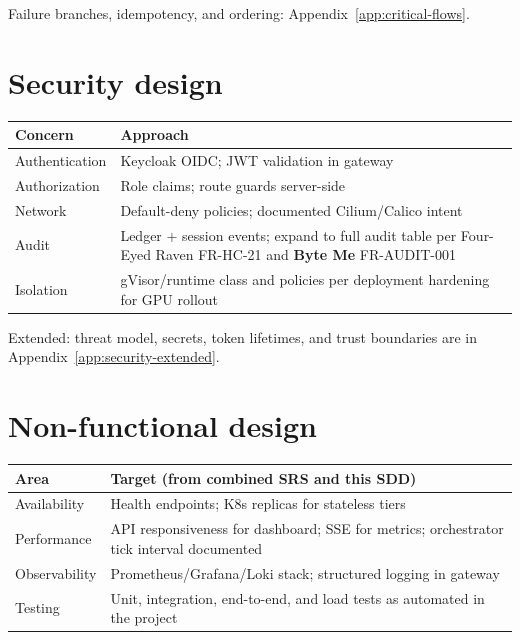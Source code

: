 \documentclass[12pt,a4paper]{article}
\newcommand{\ByteMeHeading}{Byte Me}
\newcommand{\ByteMe}{%
  \texorpdfstring{\textbf{\ByteMeHeading}}{Byte Me}%
}
\begin{document}
Failure branches, idempotency, and ordering: Appendix~\ref{app:critical-flows}.

\section{Security design}
\label{sec:security}

\begin{tabularx}{\textwidth}{@{}L{3.5cm} X@{}}
  \toprule
  \textbf{Concern} & \textbf{Approach} \\
  \midrule
  Authentication & Keycloak OIDC; JWT validation in gateway \\
  Authorization & Role claims; route guards server-side \\
  Network & Default-deny policies; documented Cilium/Calico intent \\
  Audit & Ledger + session events; expand to full audit table per Four-Eyed Raven FR-HC-21 and \ByteMe{} FR-AUDIT-001 \\
  Isolation & gVisor/runtime class and policies per deployment hardening for GPU rollout \\
  \bottomrule
\end{tabularx}

\vspace{0.5em}
\noindent Extended: threat model, secrets, token lifetimes, and trust boundaries are in Appendix~\ref{app:security-extended}.

\section{Non-functional design}
\label{sec:nfr}

\begin{tabularx}{\textwidth}{@{}L{3.8cm} X@{}}
  \toprule
  \textbf{Area} & \textbf{Target (from combined SRS and this SDD)} \\
  \midrule
  Availability & Health endpoints; K8s replicas for stateless tiers \\
  Performance & API responsiveness for dashboard; SSE for metrics; orchestrator tick interval documented \\
  Observability & Prometheus/Grafana/Loki stack; structured logging in gateway \\
  Testing & Unit, integration, end-to-end, and load tests as automated in the project \\
  \bottomrule
\end{tabularx}
\end{document}
